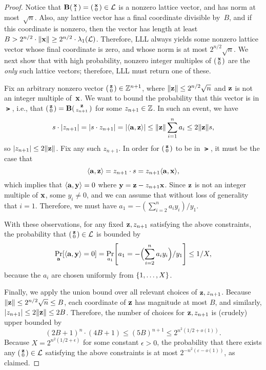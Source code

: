 \documentclass[11pt]{article}
\begin{document}
\begin{proof}
  Notice that
  $\matB \smlmat{\vecx \\ 1} = \smlmat{\vecx \\ 0} \in \lat$ is a
  nonzero lattice vector, and has norm at most~$\sqrt{n}$. Also, any
  lattice vector has a final coordinate divisible by~$B$, and if this
  coordinate is nonzero, then the vector has length at least
  $B > 2^{n/2} \cdot \length{\vecx} \geq 2^{n/2} \cdot
  \lambda_{1}(\lat)$. Therefore, LLL always yields some nonzero
  lattice vector whose final coordinate is zero, and whose norm is at
  most $2^{n/2} \sqrt{n}$. We next show that with high probability,
  nonzero integer multiples of $\smlmat{\vecx \\ 0}$ are the
  \emph{only} such lattice vectors; therefore, LLL must return one of
  these.

  Fix an arbitrary nonzero vector $\smlmat{\vecz \\ 0} \in \Z^{n+1}$,
  where $\length{\vecz} \leq 2^{n/2} \sqrt{n}$ and $\vecz$ is not an
  integer multiple of~$\vecx$. We want to bound the probability that
  this vector is in $\lat$, i.e., that
  $\smlmat{\vecz \\ 0} = \matB \smlmat{\vecz \\ z_{n+1}}$ for some
  $z_{n+1} \in \Z$. In such an event, we have
  \[ s \cdot \abs{z_{n+1}} = \abs{s \cdot z_{n+1}} =
    \abs*{\inner{\veca,\vecz}} \leq \length{\vecz} \sum_{i=1}^n a_i
    \leq 2 \length{\vecz} s, \] so $|z_{n+1}| \leq 2\length{\vecz}$.
  Fix any such $z_{n+1}$. In order for $\smlmat{\vecz \\ 0}$ to be in
  $\lat$, it must be the case that
  \[
    \inner{\veca, \vecz} = z_{n+1} \cdot s = z_{n+1}
    \inner{\veca,\vecx}, \] which implies that
  $\inner{\veca, \vecy} = 0$ where $\vecy = \vecz - z_{n+1} \vecx$.
  Since $\vecz$ is not an integer multiple of $\vecx$, some
  $y_{i} \neq 0$, and we can assume that without loss of generality
  that $i=1$. Therefore, we must have
  $a_{1} = -(\sum_{i=2}^{n} a_{i} y_{i})/y_{1}$.

  With these observations, for any fixed $\vecz, z_{n+1}$ satisfying
  the above constraints, the probability that
  $\smlmat{\vecz \\ 0} \in \lat$ is bounded by
  \[ \Pr_{\veca} \bracks*{\inner{\veca, \vecy} = 0} =
    \Pr_{a_1}\bracks*{a_1 = -\parens[\Big]{\sum_{i=2}^n a_i
        y_{i}}/y_{1}} \leq 1/X, \] because the $a_i$ are chosen
  uniformly from $\set{1,\ldots,X}$.

  Finally, we apply the union bound over all relevant choices of
  $\vecz, z_{n+1}$. Because
  $\length{\vecz} \leq 2^{n/2} \sqrt{n} \leq B$, each coordinate of
  $\vecz$ has magnitude at most $B$, and similarly,
  $\abs{z_{n+1}} \leq 2 \length{\vecz} \leq 2B$. Therefore, the number
  of choices for $\vecz, z_{n+1}$ is (crudely) upper bounded by
  \[ (2B+1)^{n} \cdot (4B+1) \leq (5B)^{n+1} \leq
    2^{n^{2}(1/2+o(1))}. \] Because $X = 2^{n^{2}(1/2+\epsilon)}$ for
  some constant $\epsilon > 0$, the probability that there exists any
  $\smlmat{\vecz \\ 0} \in \lat$ satisfying the above constraints is
  at most $2^{-n^{2}(\varepsilon - o(1))}$, as claimed.
\end{proof}
\end{document}

